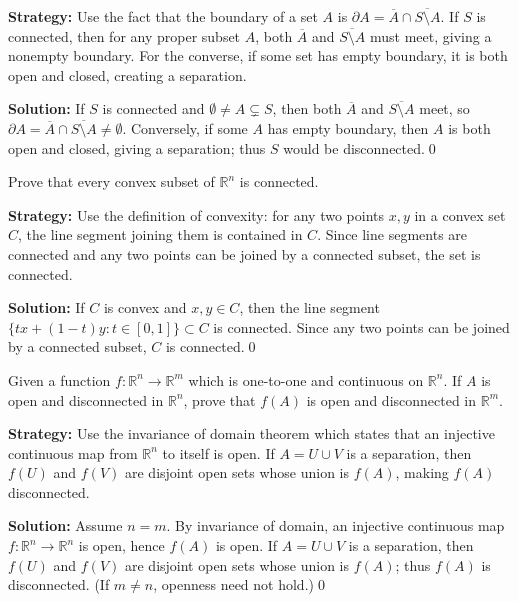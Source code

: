 \noindent\textbf{Strategy:} Use the fact that the boundary of a set $A$ is $\partial A = \overline{A} \cap \overline{S \setminus A}$. If $S$ is connected, then for any proper subset $A$, both $\overline{A}$ and $\overline{S \setminus A}$ must meet, giving a nonempty boundary. For the converse, if some set has empty boundary, it is both open and closed, creating a separation.

\bigskip\noindent\textbf{Solution:}
If $S$ is connected and $\emptyset\ne A\subsetneq S$, then both $\overline{A}$ and $\overline{S\setminus A}$ meet, so $\partial A=\overline{A}\cap\overline{S\setminus A}\ne\emptyset$. Conversely, if some $A$ has empty boundary, then $A$ is both open and closed, giving a separation; thus $S$ would be disconnected.\qed



\begin{problembox}
Prove that every convex subset of $\mathbb{R}^n$ is connected.
\end{problembox}

\noindent\textbf{Strategy:} Use the definition of convexity: for any two points $x, y$ in a convex set $C$, the line segment joining them is contained in $C$. Since line segments are connected and any two points can be joined by a connected subset, the set is connected.

\bigskip\noindent\textbf{Solution:}
If $C$ is convex and $x,y\in C$, then the line segment $\{tx+(1-t)y: t\in[0,1]\}\subset C$ is connected. Since any two points can be joined by a connected subset, $C$ is connected.\qed



\begin{problembox}
Given a function $f : \mathbb{R}^n \to \mathbb{R}^m$ which is one-to-one and continuous on $\mathbb{R}^n$. If $A$ is open and disconnected in $\mathbb{R}^n$, prove that $f(A)$ is open and disconnected in $\mathbb{R}^m$.
\end{problembox}

\noindent\textbf{Strategy:} Use the invariance of domain theorem which states that an injective continuous map from $\mathbb{R}^n$ to itself is open. If $A = U \cup V$ is a separation, then $f(U)$ and $f(V)$ are disjoint open sets whose union is $f(A)$, making $f(A)$ disconnected.

\bigskip\noindent\textbf{Solution:}
Assume $n=m$. By invariance of domain, an injective continuous map $f:\mathbb{R}^n\to\mathbb{R}^n$ is open, hence $f(A)$ is open. If $A=U\cup V$ is a separation, then $f(U)$ and $f(V)$ are disjoint open sets whose union is $f(A)$; thus $f(A)$ is disconnected. (If $m\ne n$, openness need not hold.)\qed



